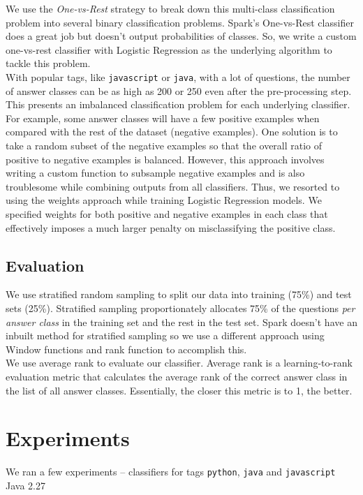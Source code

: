 \documentclass{article}
\begin{document}
We use the \textit{One-vs-Rest} strategy to break down this multi-class classification problem into several binary classification problems. Spark's One-vs-Rest classifier does a great job but doesn't output probabilities of classes. So, we write a custom one-vs-rest classifier with Logistic Regression as the underlying algorithm to tackle this problem.\\

With popular tags, like \texttt{javascript} or \texttt{java}, with a lot of questions, the number of answer classes can be as high as 200 or 250 even after the pre-processing step. This presents an imbalanced classification problem for each underlying classifier. For example, some answer classes will have a few positive examples when compared with the rest of the dataset (negative examples). One solution is to take a random subset of the negative examples so that the overall ratio of positive to negative examples is balanced. However, this approach involves writing a custom function to subsample negative examples and is also troublesome while combining outputs from all classifiers. Thus, we resorted to using the weights approach while training Logistic Regression models. We specified weights for both positive and negative examples in each class that effectively imposes a much larger penalty on misclassifying the positive class.

\subsection{Evaluation}
We use stratified random sampling to split our data into training (75\%) and test sets (25\%). Stratified sampling proportionately allocates 75\% of the questions \textit{per answer class} in the training set and the rest in the test set. Spark doesn't have an inbuilt method for stratified sampling so we use a different approach using Window functions and rank function to accomplish this.\\

We use average rank to evaluate our classifier. Average rank is a learning-to-rank evaluation metric that calculates the average rank of the correct answer class in the list of all answer classes. Essentially, the closer this metric is to 1, the better.

\section{Experiments}
We ran a few experiments -- classifiers for tags \texttt{python}, \texttt{java} and \texttt{javascript}
Java 2.27
\end{document}
